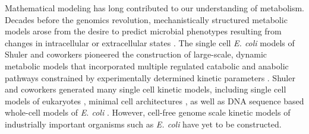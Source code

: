 \documentclass[12pt]{article}
\begin{document}
Mathematical modeling has long contributed to our understanding of metabolism.
Decades before the genomics revolution, mechanistically structured metabolic models arose from the desire to predict microbial phenotypes resulting from changes in intracellular or extracellular states \citep{1976_fredrickson_BiotechBioeng}.
The single cell \textit{E. coli} models of Shuler and coworkers pioneered the construction of large-scale, dynamic metabolic models that incorporated multiple regulated catabolic and anabolic pathways constrained by experimentally determined kinetic parameters \citep{1984_domach_shuler_BiotechBioeng_01}.
Shuler and coworkers generated many single cell kinetic models, including single cell models of eukaryotes \citep{1989_steinmeyer_shuler_ChemEngSci,1992_wu_shuler_AnnNYAcadSci}, minimal cell architectures \citep{2004_castellanos_shuler_PNAS}, as well as DNA sequence based whole-cell models of \textit{E. coli} \citep{2008_atlas_shuler_IETSysBio}.
However, cell-free genome scale kinetic models of industrially important organisms such as \textit{E. coli} have yet to be constructed.
\end{document}
